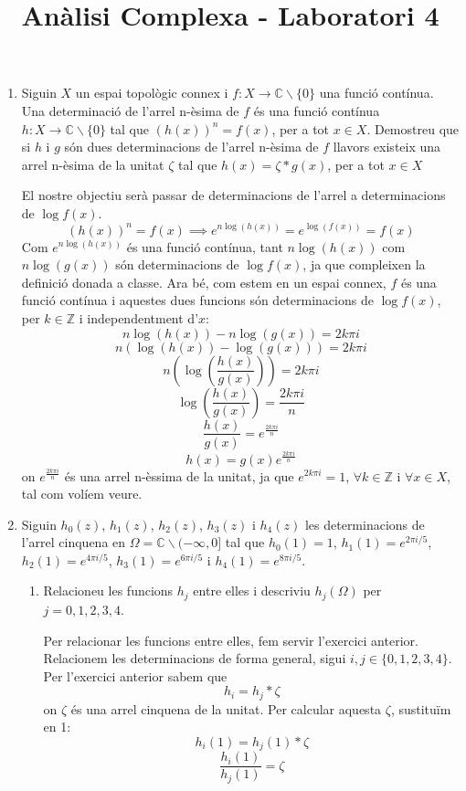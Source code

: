 \documentclass[10pt,a4paper]{article}
\author{ }
\title{Anàlisi Complexa - Laboratori 4}
\begin{document}
\maketitle

\begin{enumerate}
\item Siguin $X$ un espai topològic connex i $f:X \rightarrow \mathbb{C} \backslash \{0\}$ una funció contínua. Una determinació de l’arrel n-èsima de $f$ és una funció contínua $h:X \rightarrow \mathbb{C} \backslash \{0\}$ tal que $(h(x))^{n} = f(x)$, per a tot $x\in X$.
Demostreu que si $h$ i $g$ són dues determinacions de l’arrel n-èsima de $f$ llavors existeix una arrel n-èsima de la unitat $\zeta$ tal que $h(x) = \zeta * g(x)$, per a tot $x\in X$
	\begin{framed}
	El nostre objectiu serà passar de determinacions de l'arrel a determinacions de $\log f(x)$.
	$$(h(x))^{n} = f(x) \implies e^{n\log(h(x))} = e^{\log(f(x))} = f(x)$$
	Com $e^{n\log(h(x))}$ és una funció contínua, tant $n\log(h(x))$ com $n\log(g(x))$ són determinacions de $\log f(x)$, ja que compleixen la definició donada a classe. Ara bé, com estem en un espai connex, $f$ és una funció contínua i aquestes dues funcions són determinacions de $\log f(x)$, per $k\in\mathbb{Z}$ i independentment d'$x$:
	$$n\log(h(x)) - n\log(g(x)) = 2k\pi i$$
	$$n(\log(h(x)) - \log(g(x))) = 2k\pi i$$
	$$n\left(\log\left(\frac{h(x)}{g(x)}\right)\right) = 2k\pi i$$
	$$\log\left(\frac{h(x)}{g(x)}\right) = \frac{2k\pi i}{n}$$
	$$\frac{h(x)}{g(x)} = e^{\frac{2k\pi i}{n}}$$
	$$h(x) = g(x)e^{\frac{2k\pi i}{n}}$$
	on $e^{\frac{2k\pi i}{n}}$ és una arrel n-èssima de la unitat, ja que $e^{2k\pi i} = 1$, $\forall k\in\mathbb{Z}$ i $\forall x\in X$, tal com volíem veure.
	\end{framed}
\newpage
\item Siguin $h_{0}(z)$, $h_{1}(z)$, $h_{2}(z)$, $h_{3}(z)$ i $h_{4}(z)$ les determinacions de l'arrel cinquena en $\Omega = \mathbb{C} \backslash (-\infty,0]$ tal que $h_{0}(1)=1$, $h_{1}(1) = e^{2\pi i/5}$, $h_{2}(1) = e^{4\pi i/5}$, $h_{3}(1) = e^{6\pi i/5}$ i $h_{4}(1) = e^{8\pi i/5}$.
	\begin{enumerate}
	\item Relacioneu les funcions $h_{j}$ entre elles i descriviu $h_{j}(\Omega)$ per $j=0,1,2,3,4$.
	\begin{framed}
	Per relacionar les funcions entre elles, fem servir l'exercici anterior. Relacionem les determinacions de forma general, sigui $i,j\in\{0,1,2,3,4\}$. Per l'exercici anterior sabem que
	$$h_{i} = h_{j} * \zeta$$
	on $\zeta$ és una arrel cinquena de la unitat. Per calcular aquesta $\zeta$, sustituïm en 1:
	$$h_{i}(1) = h_{j}(1) * \zeta$$
	$$\frac{h_{i}(1)}{h_{j}(1)} = \zeta$$


\end{framed}
\end{enumerate}
\end{enumerate}
\end{document}
